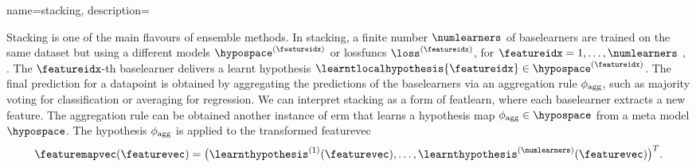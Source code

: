 {name={stacking}, 
	description={Stacking is one of the main flavours of \gls{ensemble} methods.  
		In stacking, a finite number $\numlearners$ of \glspl{baselearner} are trained on the 
		same \gls{dataset} but using a different \glspl{model} $\hypospace^{(\featureidx)}$ 
		or \glspl{lossfunc} $\loss^{(\featureidx)}$, for $\featureidx=1,\ldots,\numlearners$ \cite[Ch. 8.8]{hastie01statisticallearning},
		\cite{WOLPERT1992241,ZhouEnsemble2012}. 
		The $\featureidx$-th \gls{baselearner} delivers a learnt \gls{hypothesis} 
		$\learntlocalhypothesis{\featureidx} \in \hypospace^{(\featureidx)}$. 
		The final \gls{prediction} for a \gls{datapoint} is obtained by aggregating the 
		\glspl{prediction} of the \glspl{baselearner} via an aggregation rule $\phi_{\rm agg}$, 
		such as majority voting for \gls{classification} or averaging for \gls{regression}. 
		We can interpret stacking as a form of \gls{featlearn}, where each \gls{baselearner} 
		extracts a new \gls{feature}. The aggregation rule can be obtained another instance 
		of \gls{erm} that learns a \gls{hypothesis} map $\phi_{\rm agg} \in \hypospace$ from 
		a meta \gls{model} $\hypospace$. The \gls{hypothesis} $\phi_{\rm agg}$ is applied to the 
		transformed \gls{featurevec} $$\featuremapvec(\featurevec)= \big( \learnthypothesis^{(1)}(\featurevec), 
		\ldots, \learnthypothesis^{(\numlearners)}(\featurevec) \big)^{T}.$$
       \begin{figure}[htbp]
		\begin{center}
\end{center}
\end{figure}}}
